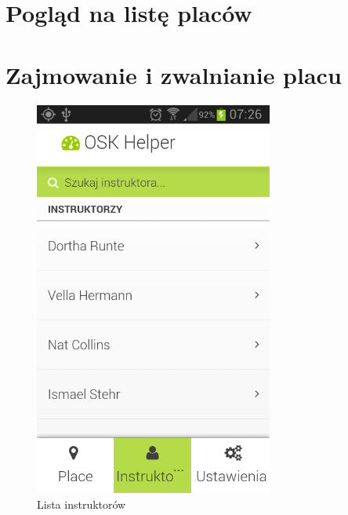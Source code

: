 \documentclass[twoside,a4paper,openright,12pt]{book}
\begin{document}
\section{Pogląd na listę placów}
\section{Zajmowanie i zwalnianie placu}


\begin{figure}[htbp]
\centering
\includegraphics[width=0.7\textwidth]{screenshots/android/lista_instruktorow.png}
\caption{Lista instruktorów}
\end{figure}
\end{document}

